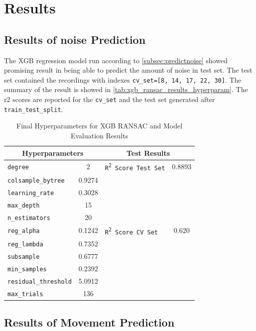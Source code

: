 \documentclass{iutbscthesis}
\begin{document}
\chapter{Results} \label{chapter:results}



\section{Results of noise Prediction}
The XGB regression model run according to \autoref{subsec:predictnoise} showed promising result in being able to predict the amount of noise in test set. The test set contained the recordings with indexes \texttt{cv\_set=[8, 14, 17, 22, 30]}. The summary of the result is showed in \autoref{tab:xgb_ransac_results_hyperparam}. The r2 scores are reported for the \texttt{cv\_set} and the test set generated after \texttt{train\_test\_split}.
\begin{table}[htbp]
\centering
\caption{Final Hyperparameters for XGB RANSAC and Model Evaluation Results}
\label{tab:xgb_ransac_results_hyperparam}
\begin{tabular}{|l|c||l|c|}
    \hline
        \multicolumn{2}{|c||}{\textbf{Hyperparameters}} & \multicolumn{2}{c|}{\textbf{Test Results}} \\
        \hline
        \texttt{degree} & 2 & \texttt{R\textsuperscript{2} Score Test Set} & 0.8893 \\
        \texttt{colsample\_bytree} & 0.9274 &  & \\
        \texttt{learning\_rate} & 0.3028 & & \\
        \texttt{max\_depth} & 15 & & \\
        \texttt{n\_estimators} & 20 & & \\
        \texttt{reg\_alpha} & 0.1242 & \texttt{R\textsuperscript{2} Score CV Set} & 0.620 \\
        \texttt{reg\_lambda} & 0.7352 & & \\
        \texttt{subsample} & 0.6777 & & \\
        \texttt{min\_samples} & 0.2392 & & \\
        \texttt{residual\_threshold} & 5.0912 & & \\
        \texttt{max\_trials} & 136 & & \\
        \hline
    \end{tabular}
\end{table}

\section{Results of Movement Prediction}
\end{document}
